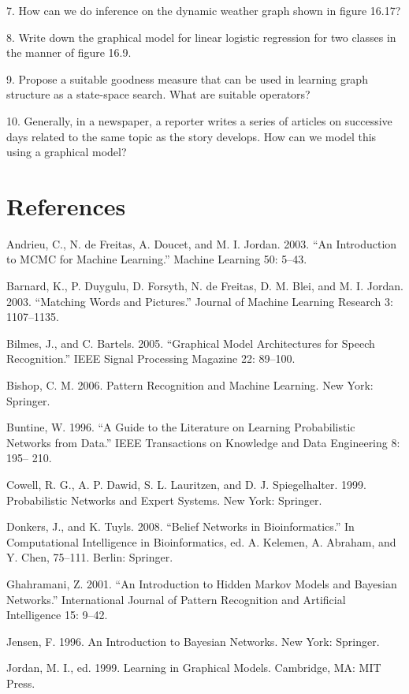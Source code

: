7. How can we do inference on the dynamic weather graph shown in figure 16.17?

8. Write down the graphical model for linear logistic regression for two classes in the manner of figure 16.9.

9. Propose a suitable goodness measure that can be used in learning graph structure as a state-space search. What are suitable operators?

10. Generally, in a newspaper, a reporter writes a series of articles on successive days related to the same topic as the story develops. How can we model this using a graphical model?

\section{References}

Andrieu, C., N. de Freitas, A. Doucet, and M. I. Jordan. 2003. “An Introduction to MCMC for Machine Learning.” Machine Learning 50: 5--43.

Barnard, K., P. Duygulu, D. Forsyth, N. de Freitas, D. M. Blei, and M. I. Jordan. 2003. “Matching Words and Pictures.” Journal of Machine Learning Research 3: 1107--1135.

Bilmes, J., and C. Bartels. 2005. “Graphical Model Architectures for Speech Recognition.” IEEE Signal Processing Magazine 22: 89--100.

Bishop, C. M. 2006. Pattern Recognition and Machine Learning. New York: Springer.

Buntine, W. 1996. “A Guide to the Literature on Learning Probabilistic Networks from Data.” IEEE Transactions on Knowledge and Data Engineering 8: 195-- 210.

Cowell, R. G., A. P. Dawid, S. L. Lauritzen, and D. J. Spiegelhalter. 1999. Probabilistic Networks and Expert Systems. New York: Springer.

Donkers, J., and K. Tuyls. 2008. “Belief Networks in Bioinformatics.” In Computational Intelligence in Bioinformatics, ed. A. Kelemen, A. Abraham, and Y. Chen, 75--111. Berlin: Springer.

Ghahramani, Z. 2001. “An Introduction to Hidden Markov Models and Bayesian Networks.” International Journal of Pattern Recognition and Artificial Intelligence 15: 9--42.

Jensen, F. 1996. An Introduction to Bayesian Networks. New York: Springer.

Jordan, M. I., ed. 1999. Learning in Graphical Models. Cambridge, MA: MIT Press.


